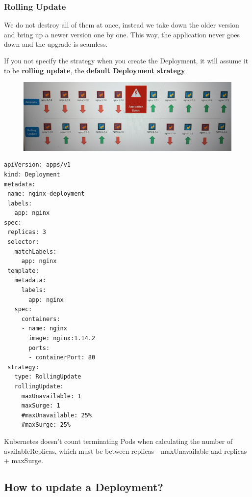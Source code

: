 \documentclass{article}
\newenvironment{blocktemplate}[1]{%
    \tcolorbox[beamer,%
    noparskip,breakable,
    colframe=Blue,%
    colbacklower=LimeGreen!75!LightGreen,%
    title=#1]}%
    {\endtcolorbox}
\newenvironment{blocktemplateI}[1]{%
    \tcolorbox[beamer,%
    noparskip,breakable,
    colframe=Violet,%
    colbacklower=Black,%
    title=#1]}%
    {\endtcolorbox}
\newenvironment{codetemplate}[1][]{%
  \mybasecolorbox[#1]
  \itshape
}{%
  \endmybasecolorbox
}
\begin{document}
\subsubsection{Rolling Update}
We do not destroy all of them at once, instead we take down the older version and bring up a newer version one by one. This way, the application never goes down and the upgrade is seamless.

\begin{blocktemplate}{NOTE}
If you not specify the strategy when you create the Deployment, it will assume it to be \textbf{rolling update}, the \textbf{default Deployment strategy}.
\end{blocktemplate}

\begin{figure}[H]
    \centering
    \includegraphics[width=\textwidth]{pictures/depest.png}
\end{figure}

\begin{codetemplate}{}
\begin{verbatim}
apiVersion: apps/v1
kind: Deployment
metadata:
 name: nginx-deployment
 labels:
   app: nginx
spec:
 replicas: 3
 selector:
   matchLabels:
     app: nginx
 template:
   metadata:
     labels:
       app: nginx
   spec:
     containers:
     - name: nginx
       image: nginx:1.14.2
       ports:
       - containerPort: 80
 strategy:
   type: RollingUpdate
   rollingUpdate:
     maxUnavailable: 1
     maxSurge: 1
     #maxUnavailable: 25%
     #maxSurge: 25%
\end{verbatim}
\end{codetemplate}

\begin{blocktemplateI}{NOTE}
Kubernetes doesn't count terminating Pods when calculating the number of availableReplicas, which must be between replicas - maxUnavailable and replicas + maxSurge.
\end{blocktemplateI}

\subsection{How to update a Deployment?}
\end{document}
